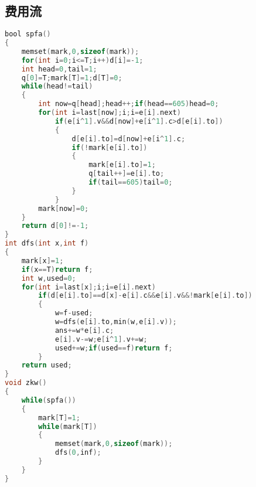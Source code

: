 \subsection{费用流}
\begin{lstlisting}[language=C]
bool spfa()
{
    memset(mark,0,sizeof(mark));
    for(int i=0;i<=T;i++)d[i]=-1;
    int head=0,tail=1;
    q[0]=T;mark[T]=1;d[T]=0;
    while(head!=tail)
    {
		int now=q[head];head++;if(head==605)head=0;
		for(int i=last[now];i;i=e[i].next)
			if(e[i^1].v&&d[now]+e[i^1].c>d[e[i].to])
			{
				d[e[i].to]=d[now]+e[i^1].c;
				if(!mark[e[i].to])
				{
					mark[e[i].to]=1;
					q[tail++]=e[i].to;
					if(tail==605)tail=0;
				}
			}
		mark[now]=0;
    }
    return d[0]!=-1;
}
int dfs(int x,int f)
{
    mark[x]=1;
    if(x==T)return f;
    int w,used=0;
    for(int i=last[x];i;i=e[i].next)
		if(d[e[i].to]==d[x]-e[i].c&&e[i].v&&!mark[e[i].to])
		{
			w=f-used;
			w=dfs(e[i].to,min(w,e[i].v));
			ans+=w*e[i].c;
			e[i].v-=w;e[i^1].v+=w;
			used+=w;if(used==f)return f;
		}
    return used;
}
void zkw()
{
    while(spfa())
    {
		mark[T]=1;
		while(mark[T])
		{
			memset(mark,0,sizeof(mark));
			dfs(0,inf);
		}
    }
}
\end{lstlisting} 
